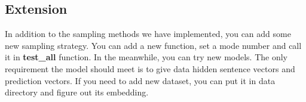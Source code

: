 \subsection{Extension}
In addition to the sampling methods we have implemented, you can add some new sampling strategy. You can add a new function, set a mode number and call it in \textbf{test\_all} function. In the meanwhile, you can try new models. The only requirement the model should meet is to give data hidden sentence vectors and prediction vectors. If you need to add new dataset, you can put it in data directory and figure out its embedding.